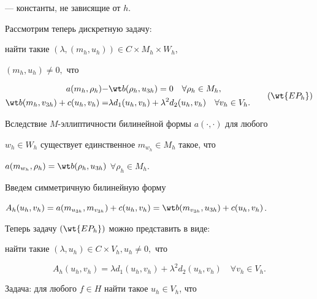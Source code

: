 --- константы, не зависящие от $h$.





Рассмотрим теперь дискретную задачу:


найти такие $(\lambda,(m_h,u_h))\in C\times M_h\times W_h$,


$(m_h,u_h)\neq 0,$ что


\begin{equation}


\begin{split}


a(m_h,\rho_h)-&\wt b(\rho_h,u_{3h})=0\quad\forall \rho_h \in M_h, \\


%


\wt b(m_h,v_{3h})+c(u_h,v_h)=&\lambda d_1(u_h,v_h)+{\lambda}^2 d_2(u_h,v_h)


\quad \forall v_h \in V_h.


\end{split}


\tag{$\wt{EP_h}$}


\end{equation}





Вследствие $M$-эллиптичности билинейной формы $a(\cdot,\cdot)$ для любого


$w_h \in W_h$ существует единственное $m_{w_h}\in M_h$ такое, что


$a(m_{w_h},\rho_h)=\wt b(\rho_h,u_{3h})$ $\forall \rho_h \in M_h$.


Введем симметричную билинейную форму


$A_h(u_h,v_h)=a(m_{u_{3h}},m_{v_{3h}})+c(u_h,v_h)=


\wt b(m_{v_{3h}},u_{3h})+c(u_h,v_h)$.


Теперь задачу $(\wt{EP_h})$ можно представить в виде:


найти такие $(\lambda,u_h)\in C\times V_h, u_h\neq 0,$ что


\begin{equation}


A_h(u_h,v_h)=\lambda d_1(u_h,v_h)+{\lambda}^2 d_2(u_h,v_h)


\quad \forall v_h \in V_h.\tag{$EP_h$}


\end{equation}





Задача: для любого $f \in H$ найти такое $u_h \in V_h$, что


